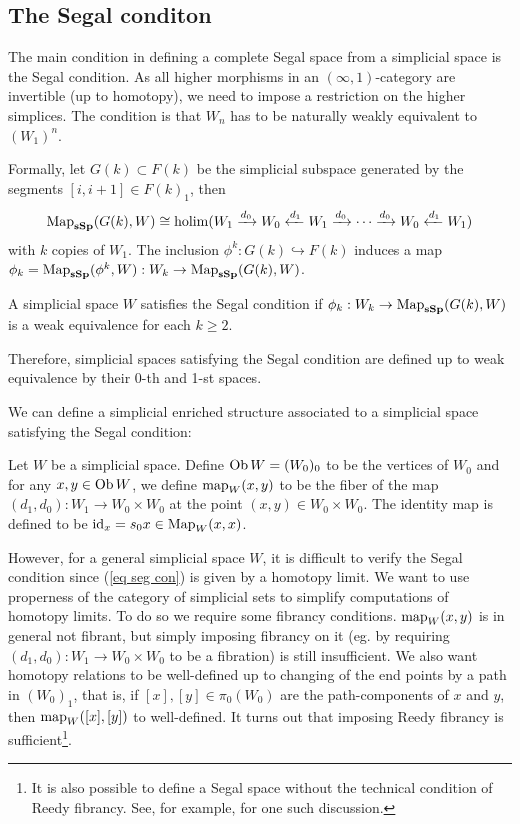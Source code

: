 \begin{refsection}
\subsection{The Segal conditon}
The main condition in defining a complete Segal space from a simplicial space is the Segal condition. As all higher morphisms in an $(\infty,1)$-category are invertible (up to homotopy), we need to impose a restriction on the higher simplices. The condition is that $W_n$ has to be naturally weakly equivalent to $(W_1)^n$.

Formally, let $G(k)\subset F(k)$ be the simplicial subspace generated by the segments $[i,i+1]\in F(k)_1$, then
\begin{equation}\label{eq seg con}
\operatorname{\mathrm{Map}}_{\mathbf{sSp}}(G(k),W)\cong\operatorname*{holim}(W_1\xrightarrow{d_0}W_0\xleftarrow{d_1}W_1\xrightarrow{d_0}\cdots\xrightarrow{d_0}W_0\xleftarrow{d_1}W_1)
\end{equation}
with $k$ copies of $W_1$. The inclusion $\phi^k:G(k)\hookrightarrow F(k)$ induces a map $\phi_k=\operatorname{\mathrm{Map}}_{\mathbf{sSp}}(\phi^k,W):W_k\to\operatorname{\mathrm{Map}}_{\mathbf{sSp}}(G(k),W)$. 

\begin{defin}
A simplicial space $W$ satisfies the Segal condition if $\phi_k:W_k\to\operatorname{\mathrm{Map}}_{\mathbf{sSp}}(G(k),W)$ is a weak equivalence for each $k\ge 2$.
\end{defin}

Therefore, simplicial spaces satisfying the Segal condition are defined up to weak equivalence by their 0-th and 1-st spaces.

We can define a simplicial enriched structure associated to a simplicial space satisfying the Segal condition:
\begin{defin}\label{simpcat}
Let $W$ be a simplicial space. Define $\operatorname{Ob} W=(W_0)_0$ to be the vertices of $W_0$ and for any $x,y\in\operatorname{Ob} W$, we define $\operatorname{\mathrm{map}}_W(x,y)$ to be the fiber of the map $(d_1,d_0):W_1\to W_0\times W_0$ at the point $(x,y)\in W_0\times W_0$. The identity map is defined to be $\mathrm{id}_x=s_0x\in\operatorname{\mathrm{Map}}_W(x,x)$.
\end{defin}
However, for a general simplicial space $W$, it is difficult to verify the Segal condition since (\ref{eq seg con}) is given by a homotopy limit. We want to use properness of the category of simplicial sets to simplify computations of homotopy limits. To do so we require some fibrancy conditions. $\operatorname{\mathrm{map}}_W(x,y)$ is in general not fibrant, but simply imposing fibrancy on it (eg. by requiring $(d_1,d_0):W_1\to W_0\times W_0$ to be a fibration) is still insufficient. We also want homotopy relations to be well-defined up to changing of the end points by a path in $(W_0)_1$, that is, if $[x],[y]\in\pi_0(W_0)$ are the path-components of $x$ and $y$, then $\operatorname{\mathrm{map}}_W([x],[y])$ to well-defined. It turns out that imposing Reedy fibrancy is sufficient\footnote{It is also possible to define a Segal space without the technical condition of Reedy fibrancy. See, for example, \cite{zhao-memoire} for one such discussion.}.


\end{refsection}
